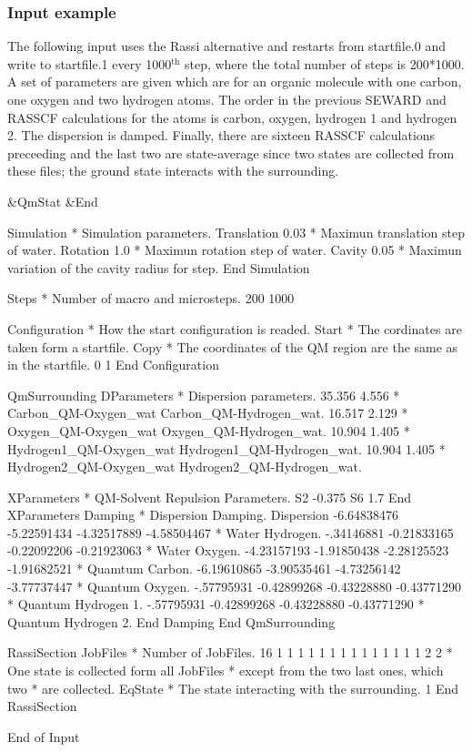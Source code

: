 \subsubsection{Input example}
The following input uses the Rassi alternative and restarts from
startfile.0 and write to startfile.1 every 1000$^\mathrm{th}$ step, where
the total number of steps is 200*1000. A set of parameters are
given which are for an organic molecule with one carbon,
one oxygen and two hydrogen atoms. The order in the previous
SEWARD and RASSCF calculations for the atoms is carbon,
oxygen, hydrogen 1 and hydrogen 2. The dispersion is damped. Finally,
there are sixteen RASSCF calculations preceeding and the last
two are state-average since two states are collected from these
files; the ground state interacts with the surrounding.
\begin{inputlisting}
 &QmStat &End

Simulation       * Simulation parameters.
Translation
0.03             * Maximun translation step of water.
Rotation
1.0              * Maximun rotation step of water.
Cavity
0.05             * Maximun variation of the cavity radius for step.
End Simulation

Steps            * Number of macro and microsteps.
200 1000

Configuration    * How the start configuration is readed.
Start            * The cordinates are taken form a startfile.
Copy             * The coordinates of the QM region are the same as in the startfile.
0 1
End Configuration

QmSurrounding
DParameters      * Dispersion parameters.
35.356 4.556     * Carbon_{QM}-Oxygen_{wat}     Carbon_{QM}-Hydrogen_{wat}.
16.517 2.129     * Oxygen_{QM}-Oxygen_{wat}     Oxygen_{QM}-Hydrogen_{wat}.
10.904 1.405     * Hydrogen1_{QM}-Oxygen_{wat}  Hydrogen1_{QM}-Hydrogen_{wat}.
10.904 1.405     * Hydrogen2_{QM}-Oxygen_{wat}  Hydrogen2_{QM}-Hydrogen_{wat}.

XParameters      * QM-Solvent Repulsion Parameters.
S2
-0.375
S6
1.7
End XParameters
Damping          * Dispersion Damping.
Dispersion
-6.64838476  -5.22591434  -4.32517889 -4.58504467     * Water Hydrogen.
-.34146881   -0.21833165  -0.22092206 -0.21923063     * Water Oxygen.
-4.23157193  -1.91850438  -2.28125523  -1.91682521    * Quamtum Carbon.
-6.19610865  -3.90535461  -4.73256142  -3.77737447    * Quantum Oxygen.
-.57795931   -0.42899268  -0.43228880  -0.43771290    * Quantum Hydrogen 1.
-.57795931   -0.42899268  -0.43228880  -0.43771290    * Quantum Hydrogen 2.
End Damping
End QmSurrounding

RassiSection
JobFiles          * Number of JobFiles.
16
1 1 1 1 1 1 1 1 1 1 1 1 1 1 2 2      * One state is collected form all JobFiles
*                                      except from the two last ones, which two
*                                      are collected.
EqState           * The state interacting with the surrounding.
1
End RassiSection

End of Input

\end{inputlisting}

